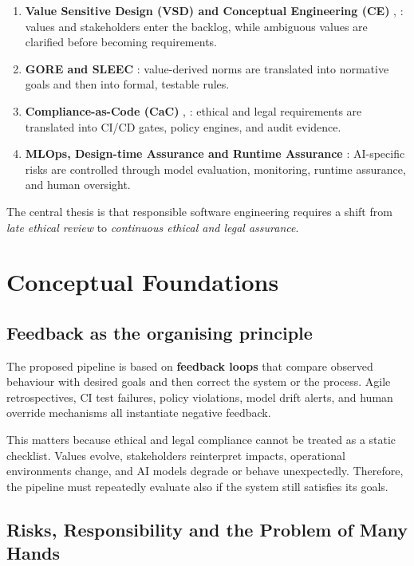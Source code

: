 \documentclass[11pt,a4paper]{article}
\begin{document}
\begin{enumerate}
    \item \textbf{Value Sensitive Design (VSD) and Conceptual Engineering (CE)} \cite{vsd}, \cite[Secs.~2--4]{veluwenkamp_ce}: values and stakeholders enter the backlog, while ambiguous values are clarified before becoming requirements.
    \item \textbf{GORE and SLEEC} \cite[Secs.~2--3]{silva_gore_sleec}: value-derived norms are translated into normative goals and then into formal, testable rules.
    \item \textbf{Compliance-as-Code (CaC)} \cite[Secs.~2--4]{potharalanka_cac}, \cite[Secs.~3--5]{cac}: ethical and legal requirements are translated into CI/CD gates, policy engines, and audit evidence.
    \item \textbf{MLOps, Design-time Assurance and Runtime Assurance} \cite[Secs.~6.3, ~7.1, ~8.4.2 and~8.5.2]{taid_whitepaper}: AI-specific risks are controlled through model evaluation, monitoring, runtime assurance, and human oversight.
\end{enumerate}

The central thesis is that responsible software engineering requires a shift from \emph{late ethical review} to \emph{continuous ethical and legal assurance}.


\section{Conceptual Foundations}

\subsection{Feedback as the organising principle}

The proposed pipeline is based on \textbf{feedback loops} that compare observed behaviour with desired goals and then correct the system or the process. Agile retrospectives, CI test failures, policy violations, model drift alerts, and human override mechanisms all instantiate negative feedback.

This matters because ethical and legal compliance cannot be treated as a static checklist. Values evolve, stakeholders reinterpret impacts, operational environments change, and AI models degrade or behave unexpectedly. Therefore, the pipeline must repeatedly evaluate also if the system still satisfies its goals.

\subsection{Risks, Responsibility and the Problem of Many Hands}
\end{document}
